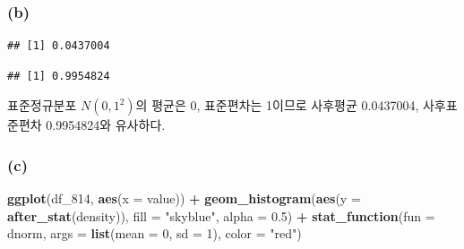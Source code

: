 \documentclass[
]{article}
\newenvironment{Shaded}{\begin{snugshade}}{\end{snugshade}}
\newcommand{\AttributeTok}[1]{\textcolor[rgb]{0.13,0.29,0.53}{#1}}
\newcommand{\DecValTok}[1]{\textcolor[rgb]{0.00,0.00,0.81}{#1}}
\newcommand{\FloatTok}[1]{\textcolor[rgb]{0.00,0.00,0.81}{#1}}
\newcommand{\FunctionTok}[1]{\textcolor[rgb]{0.13,0.29,0.53}{\textbf{#1}}}
\newcommand{\NormalTok}[1]{#1}
\newcommand{\SpecialCharTok}[1]{\textcolor[rgb]{0.81,0.36,0.00}{\textbf{#1}}}
\newcommand{\StringTok}[1]{\textcolor[rgb]{0.31,0.60,0.02}{#1}}
\begin{document}
\subsubsection{(b)}\label{b-3}

\begin{Shaded}
\end{Shaded}

\begin{verbatim}
## [1] 0.0437004
\end{verbatim}

\begin{Shaded}
\end{Shaded}

\begin{verbatim}
## [1] 0.9954824
\end{verbatim}

표준정규분포 \(N(0, 1^2)\)의 평균은 0, 표준편차는 1이므로 사후평균
0.0437004, 사후표준편차 0.9954824와 유사하다.

\subsubsection{(c)}\label{c-3}

\begin{Shaded}
\begin{Highlighting}[]
\FunctionTok{ggplot}\NormalTok{(df\_814, }\FunctionTok{aes}\NormalTok{(}\AttributeTok{x =}\NormalTok{ value)) }\SpecialCharTok{+}
  \FunctionTok{geom\_histogram}\NormalTok{(}\FunctionTok{aes}\NormalTok{(}\AttributeTok{y =} \FunctionTok{after\_stat}\NormalTok{(density)), }\AttributeTok{fill =} \StringTok{"skyblue"}\NormalTok{, }\AttributeTok{alpha =} \FloatTok{0.5}\NormalTok{) }\SpecialCharTok{+}
  \FunctionTok{stat\_function}\NormalTok{(}\AttributeTok{fun =}\NormalTok{ dnorm, }\AttributeTok{args =} \FunctionTok{list}\NormalTok{(}\AttributeTok{mean =} \DecValTok{0}\NormalTok{, }\AttributeTok{sd =} \DecValTok{1}\NormalTok{), }\AttributeTok{color =} \StringTok{"red"}\NormalTok{) }
\end{Highlighting}
\end{Shaded}
\end{document}
